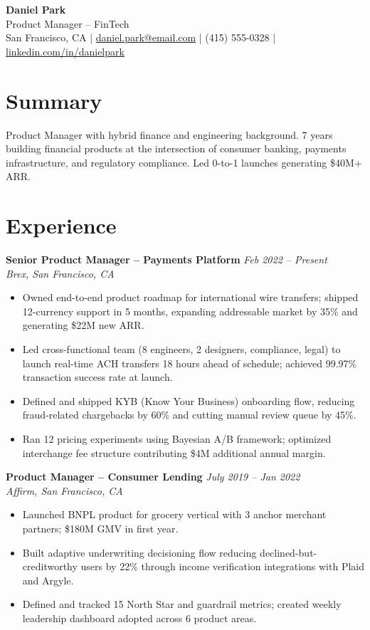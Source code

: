 \documentclass[11pt,a4paper]{article}
\begin{document}
\begin{center}
  {\LARGE \textbf{Daniel Park}}\\[3pt]
  {\large \textcolor{accent}{Product Manager -- FinTech}}\\[4pt]
  San Francisco, CA \quad|\quad
  \href{mailto:daniel.park@email.com}{daniel.park@email.com} \quad|\quad
  (415) 555-0328 \quad|\quad
  \href{https://linkedin.com/in/danielpark}{linkedin.com/in/danielpark}
\end{center}

\section{Summary}
Product Manager with hybrid finance and engineering background. 7 years building financial products at the intersection of consumer banking, payments infrastructure, and regulatory compliance. Led 0-to-1 launches generating \$40M+ ARR.

\section{Experience}

\noindent\textbf{Senior Product Manager -- Payments Platform} \hfill \textit{Feb 2022 -- Present}\\
\textit{Brex, San Francisco, CA}
\begin{itemize}
  \item Owned end-to-end product roadmap for international wire transfers; shipped 12-currency support in 5 months, expanding addressable market by 35\% and generating \$22M new ARR.
  \item Led cross-functional team (8 engineers, 2 designers, compliance, legal) to launch real-time ACH transfers 18 hours ahead of schedule; achieved 99.97\% transaction success rate at launch.
  \item Defined and shipped KYB (Know Your Business) onboarding flow, reducing fraud-related chargebacks by 60\% and cutting manual review queue by 45\%.
  \item Ran 12 pricing experiments using Bayesian A/B framework; optimized interchange fee structure contributing \$4M additional annual margin.
\end{itemize}

\vspace{4pt}
\noindent\textbf{Product Manager -- Consumer Lending} \hfill \textit{July 2019 -- Jan 2022}\\
\textit{Affirm, San Francisco, CA}
\begin{itemize}
  \item Launched BNPL product for grocery vertical with 3 anchor merchant partners; \$180M GMV in first year.
  \item Built adaptive underwriting decisioning flow reducing declined-but-creditworthy users by 22\% through income verification integrations with Plaid and Argyle.
  \item Defined and tracked 15 North Star and guardrail metrics; created weekly leadership dashboard adopted across 6 product areas.
\end{itemize}
\end{document}
